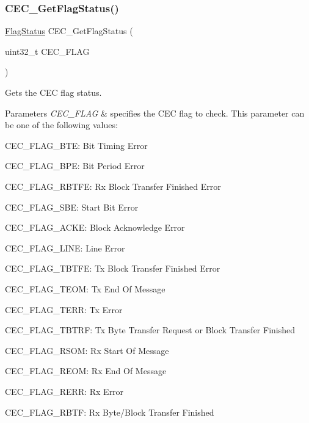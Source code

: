 \subsubsection{\texorpdfstring{CEC\_GetFlagStatus()}{CEC\_GetFlagStatus()}}
{\footnotesize\ttfamily \mbox{\hyperlink{group___exported__types_ga89136caac2e14c55151f527ac02daaff}{Flag\+Status}} C\+E\+C\+\_\+\+Get\+Flag\+Status (\begin{DoxyParamCaption}\item[{uint32\+\_\+t}]{C\+E\+C\+\_\+\+F\+L\+AG }\end{DoxyParamCaption})}



Gets the C\+EC flag status. 


\begin{DoxyParams}{Parameters}
{\em C\+E\+C\+\_\+\+F\+L\+AG} & specifies the C\+EC flag to check. This parameter can be one of the following values\+: \begin{DoxyItemize}
\item C\+E\+C\+\_\+\+F\+L\+A\+G\+\_\+\+B\+TE\+: Bit Timing Error \item C\+E\+C\+\_\+\+F\+L\+A\+G\+\_\+\+B\+PE\+: Bit Period Error \item C\+E\+C\+\_\+\+F\+L\+A\+G\+\_\+\+R\+B\+T\+FE\+: Rx Block Transfer Finished Error \item C\+E\+C\+\_\+\+F\+L\+A\+G\+\_\+\+S\+BE\+: Start Bit Error \item C\+E\+C\+\_\+\+F\+L\+A\+G\+\_\+\+A\+C\+KE\+: Block Acknowledge Error \item C\+E\+C\+\_\+\+F\+L\+A\+G\+\_\+\+L\+I\+NE\+: Line Error \item C\+E\+C\+\_\+\+F\+L\+A\+G\+\_\+\+T\+B\+T\+FE\+: Tx Block Transfer Finished Error \item C\+E\+C\+\_\+\+F\+L\+A\+G\+\_\+\+T\+E\+OM\+: Tx End Of Message \item C\+E\+C\+\_\+\+F\+L\+A\+G\+\_\+\+T\+E\+RR\+: Tx Error \item C\+E\+C\+\_\+\+F\+L\+A\+G\+\_\+\+T\+B\+T\+RF\+: Tx Byte Transfer Request or Block Transfer Finished \item C\+E\+C\+\_\+\+F\+L\+A\+G\+\_\+\+R\+S\+OM\+: Rx Start Of Message \item C\+E\+C\+\_\+\+F\+L\+A\+G\+\_\+\+R\+E\+OM\+: Rx End Of Message \item C\+E\+C\+\_\+\+F\+L\+A\+G\+\_\+\+R\+E\+RR\+: Rx Error \item C\+E\+C\+\_\+\+F\+L\+A\+G\+\_\+\+R\+B\+TF\+: Rx Byte/\+Block Transfer Finished \end{DoxyItemize}
\\
\hline
\end{DoxyParams}

